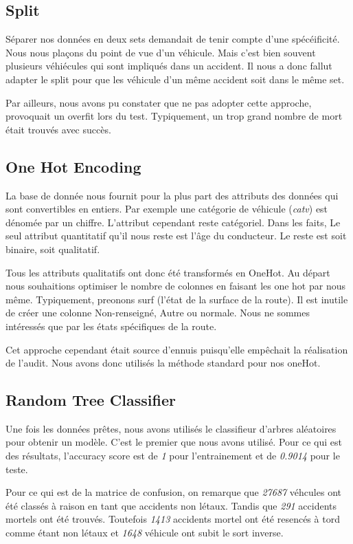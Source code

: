 \documentclass{article}
\begin{document}
    \subsection{Split}
    Séparer nos données en deux sets demandait de tenir compte d'une spécéificité. Nous nous plaçons du point de vue d'un véhicule. 
    Mais c'est bien souvent plusieurs véhiécules qui sont impliqués dans un accident. Il nous a donc fallut adapter le split pour que 
    les véhicule d'un même accident soit dans le même set. 
    
    Par ailleurs, nous avons pu constater que ne pas adopter cette approche, provoquait un overfit lors du test. Typiquement, un trop 
    grand nombre de mort était trouvés avec succès.

    \subsection{One Hot Encoding}
    La base de donnée nous fournit pour la plus part des attributs des données qui sont convertibles en entiers. 
    Par exemple une catégorie de véhicule (\textit{catv}) est dénomée par un chiffre. L'attribut cependant reste catégoriel. Dans les faits, 
    Le seul attribut quantitatif qu'il nous reste est l'âge du conducteur. 
    Le reste est soit binaire, soit qualitatif. 
    
    Tous les attributs qualitatifs ont donc été transformés en OneHot. Au départ nous souhaitions optimiser le nombre de colonnes en 
    faisant les one hot par nous même. Typiquement, preonons surf (l'état de la surface de la route). Il est inutile de créer une colonne 
    Non-renseigné, Autre ou normale. Nous ne sommes intéressés que par les états spécifiques de la route. 

    Cet approche cependant était source d'ennuis puisqu'elle empêchait la réalisation de l'audit. Nous avons donc utilisés la méthode 
    standard pour nos oneHot. 

    \subsection{Random Tree Classifier}
    Une fois les données prêtes, nous avons utilisés le classifieur d'arbres aléatoires pour obtenir un modèle. C'est le premier que nous 
    avons utilisé. Pour ce qui est des résultats, l'accuracy score est de \textit{1} pour l'entrainement et de \textit{0.9014} pour le teste.
    
    Pour ce qui est de la matrice de confusion, on remarque que \textit{27687} véhcules ont été classés à raison en tant que accidents non létaux.
    Tandis que \textit{291} accidents mortels ont été trouvés. Toutefois \textit{1413} accidents mortel ont été resencés à tord comme étant 
    non létaux et \textit{1648} véhicule ont subit le sort inverse. 
\end{document}
